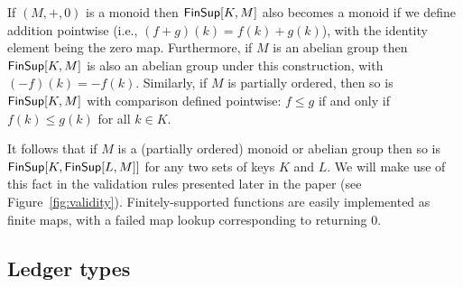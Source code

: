 If $(M,+,0)$ is a monoid then $\FinSup{K}{M}$ also becomes a monoid if we define addition pointwise (i.e., $(f+g)(k) = f(k) + g(k)$), with the identity element being the zero map.
Furthermore, if $M$ is an abelian group then $\FinSup{K}{M}$ is also an abelian group under this construction, with $(-f)(k) = -f(k)$.
Similarly, if $M$ is partially ordered, then so is $\FinSup{K}{M}$ with comparison defined pointwise: $f \leq g$ if and only if $f(k) \leq g(k)$ for all $k \in K$.

It follows that if $M$ is a (partially ordered) monoid or abelian group then so is $\FinSup{K}{\FinSup{L}{M}}$ for any two sets of keys $K$ and $L$.
We will make use of this fact in the validation rules presented later in the paper (see Figure~\ref{fig:validity}).
Finitely-supported functions are easily implemented as finite maps, with a failed map lookup corresponding to returning 0.

\subsection{Ledger types}

